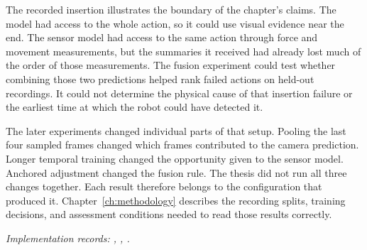 The recorded insertion illustrates the boundary of the chapter’s claims. The model had
access to the whole action, so it could use visual evidence near the end. The sensor
model had access to the same action through force and movement measurements, but the
summaries it received had already lost much of the order of those measurements. The
fusion experiment could test whether combining those two predictions helped rank failed
actions on held-out recordings. It could not determine the physical cause of that
insertion failure or the earliest time at which the robot could have detected it.

The later experiments changed individual parts of that setup. Pooling the last four
sampled frames changed which frames contributed to the camera prediction. Longer
temporal training changed the opportunity given to the sensor model. Anchored adjustment
changed the fusion rule. The thesis did not run all three changes together. Each result
therefore belongs to the configuration that produced it. Chapter~\ref{ch:methodology}
describes the recording splits, training decisions, and assessment conditions needed to
read those results correctly.

\textit{Implementation records: , , .}
